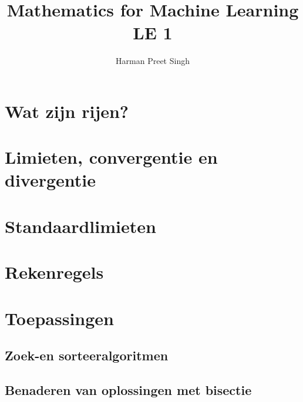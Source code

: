 \documentclass[a4paper, 12pt]{article}
\title{Mathematics for Machine Learning \textemdash{} LE 1}
\author{Harman Preet Singh}
\begin{document}

\maketitle
\tableofcontents

\section{Wat zijn rijen?}
\section{Limieten, convergentie en divergentie}
\section{Standaardlimieten}
\section{Rekenregels}

\section{Toepassingen}
\subsection{Zoek-en sorteeralgoritmen}
\subsection{Benaderen van oplossingen met bisectie}
\end{document}
